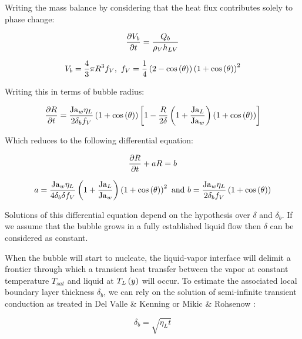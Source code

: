 Writing the mass balance by considering that the heat flux contributes solely to phase change:

\begin{align}
\frac{\partial{V_{b}}}{\partial t}=\frac{Q_{b}}{\rho_{V}h_{LV}}
\end{align}

\begin{equation}
V_{b} = \frac{4}{3}\pi R^{3} f_{V},\ f_{V} = \frac{1}{4}\parth{2-\cos{\theta}}\parth{1+\cos{\theta}}^{2}
\end{equation}

Writing this in terms of bubble radius:

\begin{align}
\frac{\partial{R}}{\partial t} = \frac{\mathrm{Ja}_{w} \eta_{L}}{2 \delta_{b} f_{V} } \left( 1+\mathrm{cos}\left( \theta \right) \right) \left[ 1 - \frac{R}{2\delta}\left(  1 + \frac{\mathrm{Ja}_{L}}{\mathrm{Ja}_{w}}  \right) \left(  1 + \mathrm{cos}\left( \theta \right)  \right)  \right]
\end{align}

Which reduces to the following differential equation:

\begin{equation}
\frac{\partial{R}}{\partial t} + aR = b
\label{eq:diff_eq_growth}
\end{equation}

\begin{equation}
a = \frac{\mathrm{Ja}_{w}\eta_{L}}{4 \delta_{b} \delta f_{V} } \left( 1 + \frac{\mathrm{Ja}_{L}}{\mathrm{Ja}_{w}}  \right) \left( 1 + \mathrm{cos}\left( \theta \right)  \right)^{2} \ \text{and} \  b = \frac{\mathrm{Ja}_{w}\eta_{L}}{2 \delta_{b} f_{V} }\left( 1 + \mathrm{cos}\left( \theta \right)  \right)
\end{equation}


\npar

Solutions of this differential equation depend on the hypothesis over $\delta$ and $\delta_{b}$. If we assume that the bubble grows in a fully established liquid flow then $\delta$ can be considered as constant.

When the bubble will start to nucleate, the liquid-vapor interface will delimit a frontier through which a transient heat transfer between the vapor at constant temperature $T_{sat}$ and liquid at $T_{L}\left( y \right)$ will occur. To estimate the associated local boundary layer thickness $\delta_{b}$, we can rely on the solution of semi-infinite transient conduction as treated in Del Valle \& Kenning \cite{del_valle_subcooled_1985} or Mikic \& Rohsenow \cite{mikic_bubble_1970}:

\begin{equation}
\delta_{b} = \sqrt{\eta_{L}t}
\label{eq:TBL_expgrowth}
\end{equation}

